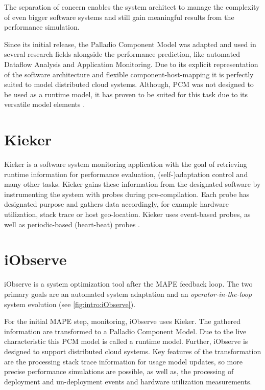 The separation of concern enables the system architect to manage the complexity of even bigger software systems and still gain meaningful results from the performance simulation.

Since its initial release, the Palladio Component Model was adapted and used in several research fields alongside the performance prediction, like automated Dataflow Analysis and Application Monitoring. Due to its explicit representation of the software architecture and flexible component-host-mapping it is perfectly suited to model distributed cloud systems. Although, PCM was not designed to be used as a runtime model, it has proven to be suited for this task due to its versatile model elements \cite{Becker.2009}.

\section{Kieker}
\label{sec:Foundations:Kieker}

Kieker is a software system monitoring application with the goal of retrieving runtime information for performance evaluation, (self-)adaptation control and many other tasks. Kieker gains these information from the designated software by instrumenting the system with probes during pre-compilation. Each probe has designated purpose and gathers data accordingly, for example hardware utilization, stack trace or host geo-location. Kieker uses event-based probes, as well as periodic-based (heart-beat) probes \cite{kieker.web}.


\section{iObserve}
\label{sec:Foundations:iobserve}

iObserve is a system optimization tool after the MAPE feedback loop. The two primary goals are an automated system adaptation and an \textit{operator-in-the-loop} system evolution (see \autoref{fig:intro:iObserve}).

For the initial MAPE step, monitoring, iObserve uses Kieker. The gathered information are transformed to a Palladio Component Model. Due to the live characteristic this PCM model is called a runtime model. Further, iObserve is designed to support distributed cloud systems. Key features of the transformation are the processing stack trace information for usage model updates, so more precise performance simulations are possible, as well as, the processing of deployment and un-deployment events and hardware utilization measurements.


